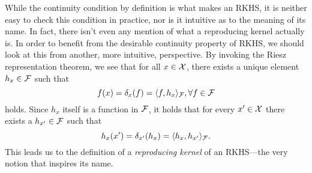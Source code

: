 %
%

While the continuity condition by definition is what makes an RKHS, it is neither easy to check this condition in practice, nor is it intuitive as to the meaning of its name.
In fact, there isn't even any mention of what a reproducing kernel actually is.
In order to benefit from the desirable continuity property of RKHS, we should look at this from another, more intuitive, perspective. 
By invoking the Riesz representation theorem, we see that for all $x\in{\mathcal X}$, there exists a unique element $h_x\in{\mathcal F}$ such that
\[
  f(x) = \delta_x(f) = \langle f,h_x\rangle_{\mathcal F}, \forall f \in {\mathcal F}
\]
holds. 
Since $h_x$ itself is a function in ${\mathcal F}$, it holds that for every $x' \in {\mathcal X}$ there exists a $h_{x'}\in{\mathcal F}$ such that
\[
  h_{x}(x') = \delta_{x'}(h_{x}) = \langle h_x,h_{x'}\rangle_{\mathcal F}.
\]
This leads us to the definition of a \emph{reproducing kernel} of an RKHS---the very notion that inspires its name.


